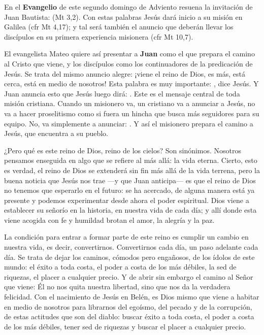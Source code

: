 			\begin{body}
				En el \textbf{Evangelio} de este segundo domingo de Adviento resuena la invitación de Juan Bautista:  (Mt 3,2). Con estas palabras Jesús dará inicio a su misión en Galilea (cfr Mt 4,17); y tal será también el anuncio que deberán llevar los discípulos en su primera experiencia misionera (cfr Mt 10,7).
				
				El evangelista Mateo quiere así presentar a \textbf{Juan} como el que prepara el camino al Cristo que viene, y los discípulos como los continuadores de la predicación de Jesús. Se trata del mismo anuncio alegre: ¡viene el reino de Dios, es más, está cerca, está en medio de nosotros! Esta palabra es muy importante: , dice Jesús. Y Juan anuncia esto que Jesús luego dirá: . Este es el mensaje central de toda misión cristiana. Cuando un misionero va, un cristiano va a anunciar a Jesús, no va a hacer proselitismo como si fuera un hincha que busca más seguidores para su equipo. No, va simplemente a anunciar: . Y así el misionero prepara el camino a Jesús, que encuentra a su pueblo.
				
				¿Pero qué es este reino de Dios, reino de los cielos? Son sinónimos. Nosotros pensamos enseguida en algo que se refiere al más allá: la vida eterna. Cierto, esto es verdad, el reino de Dios se extenderá sin fin más allá de la vida terrena, pero la buena noticia que Jesús nos trae ---y que Juan anticipa--- es que el reino de Dios no tenemos que esperarlo en el futuro: se ha acercado, de alguna manera está ya presente y podemos experimentar desde ahora el poder espiritual. Dios viene a establecer su señorío en la historia, en nuestra vida de cada día; y allí donde esta viene acogida con fe y humildad brotan el amor, la alegría y la paz.
				
				La condición para entrar a formar parte de este reino es cumplir un cambio en nuestra vida, es decir, convertirnos. Convertirnos cada día, un paso adelante cada día. Se trata de dejar los caminos, cómodos pero engañosos, de los ídolos de este mundo: el éxito a toda costa, el poder a costa de los más débiles, la sed de riquezas, el placer a cualquier precio. Y de abrir sin embargo el camino al Señor que viene: Él no nos quita nuestra libertad, sino que nos da la verdadera felicidad. Con el nacimiento de Jesús en Belén, es Dios mismo que viene a habitar en medio de nosotros para librarnos del egoísmo, del pecado y de la corrupción, de estas actitudes que son del diablo: buscar éxito a toda costa, el poder a costa de los más débiles, tener sed de riquezas y buscar el placer a cualquier precio.
				

\end{body}
